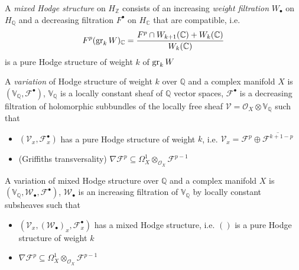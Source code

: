 \documentclass[main]{subfiles}
\begin{document}
\begin{definition}
A \textit{mixed Hodge structure} on $H_{\mathbb Z}$ consists of an increasing \textit{weight filtration} $W_\bullet$ on $H_{\mathbb Q}$ and a decreasing filtration $F^\bullet$ on $H_{\mathbb C}$ that are compatible, i.e.
\[F^p(\operatorname{gr}_kW)_{\mathbb C}=\frac{F^p\cap W_{k+1}(\mathbb C)+W_k(\mathbb C)}{W_k(\mathbb C)}\]
is a pure Hodge structure of weight $k$ of $\operatorname{gr}_kW$
\end{definition}

\begin{definition}
A \textit{variation} of Hodge structure of weight $k$ over $\mathbb Q$ and a complex manifold $X$ is $(\mathbb V_{\mathbb Q},\mathcal F^\bullet)$, $\mathbb V_{\mathbb Q}$ is a locally constant sheaf of $\mathbb Q$ vector spaces, $\mathcal F^\bullet$ is a decreasing filtration of holomorphic subbundles of the locally free sheaf $\mathcal V=\mathcal O_X\otimes\mathbb V_{\mathbb Q}$ such that
\begin{itemize}
\item $(\mathcal V_x,\mathcal F^\bullet_x)$ has a pure Hodge structure of weight $k$, i.e. $\mathcal V_x=\mathcal F^p\oplus\overline{\mathcal F^{k+1-p}}$
\item (Griffiths transversality) $\nabla\mathcal F^p\subseteq\Omega^1_X\otimes_{\mathcal O_X}\mathcal F^{p-1}$
\end{itemize}
\end{definition}

\begin{definition}
A variation of mixed Hodge structure over $\mathbb Q$ and a complex manifold $X$ is $(\mathbb V_{\mathbb Q},\mathcal W_\bullet,\mathcal F^\bullet)$, $\mathcal W_\bullet$ is an increasing filtration of $\mathbb V_{\mathbb Q}$ by locally constant subsheaves such that
\begin{itemize}
\item $(\mathcal V_x,(\mathcal W_\bullet)_x,\mathcal F^\bullet_x)$ has a mixed Hodge structure, i.e. $()$ is a pure Hodge structure of weight $k$
\item $\nabla\mathcal F^p\subseteq\Omega^1_X\otimes_{\mathcal O_X}\mathcal F^{p-1}$
\end{itemize}
\end{definition}
\end{document}
